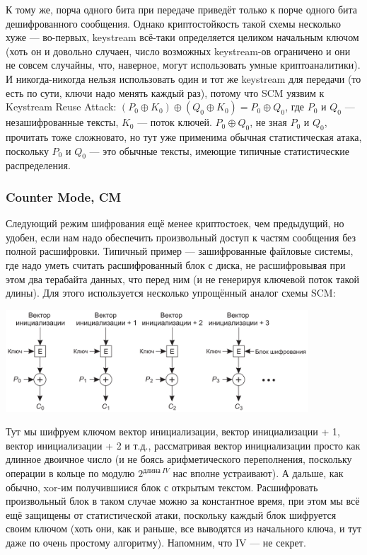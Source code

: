 \documentclass{../../text-style}
\begin{document}
К тому же, порча одного бита при передаче приведёт только к порче одного бита дешифрованного сообщения. Однако криптостойкость такой схемы несколько хуже --- во-первых, keystream всё-таки определяется целиком начальным ключом (хоть он и довольно случаен, число возможных keystream-ов ограничено и они не совсем случайны, что, наверное, могут использовать умные криптоаналитики). И никогда-никогда нельзя использовать один и тот же keystream для передачи (то есть по сути, ключи надо менять каждый раз), потому что SCM уязвим к Keystream Reuse Attack: $(P_0 \oplus K_0) \oplus (Q_0 \oplus K_0) = P_0 \oplus Q_0$, где $P_0$ и $Q_0$ --- незашифрованные тексты, $K_0$ --- поток ключей.  $P_0 \oplus Q_0$, не зная $P_0$ и $Q_0$, прочитать тоже сложновато, но тут уже применима обычная статистическая атака, поскольку $P_0$ и $Q_0$ --- это обычные тексты, имеющие типичные статистические распределения.

\subsubsection{Counter Mode, CM}

Следующий режим шифрования ещё менее криптостоек, чем предыдущий, но удобен, если нам надо обеспечить произвольный доступ к частям сообщения без полной расшифровки. Типичный пример --- зашифрованные файловые системы, где надо уметь считать расшифрованный блок с диска, не расшифровывая при этом два терабайта данных, что перед ним (и не генерируя ключевой поток такой длины). Для этого используется несколько упрощённый аналог схемы SCM:

\begin{center}
    \includegraphics[width=0.85\textwidth]{cm.png}
\end{center}

Тут мы шифруем ключом вектор инициализации, вектор инициализации + 1, вектор инициализации + 2 и т.д., рассматривая вектор инициализации просто как длинное двоичное число (и не боясь арифметического переполнения, поскольку операции в кольце по модулю $2^{длина\ IV}$ нас вполне устраивают). А дальше, как обычно, xor-им получившиися блок с открытым текстом. Расшифровать произвольный блок в таком случае можно за константное время, при этом мы всё ещё защищены от статистической атаки, поскольку каждый блок шифруется своим ключом (хоть они, как и раньше, все выводятся из начального ключа, и тут даже по очень простому алгоритму). Напомним, что IV --- не секрет.
\end{document}
